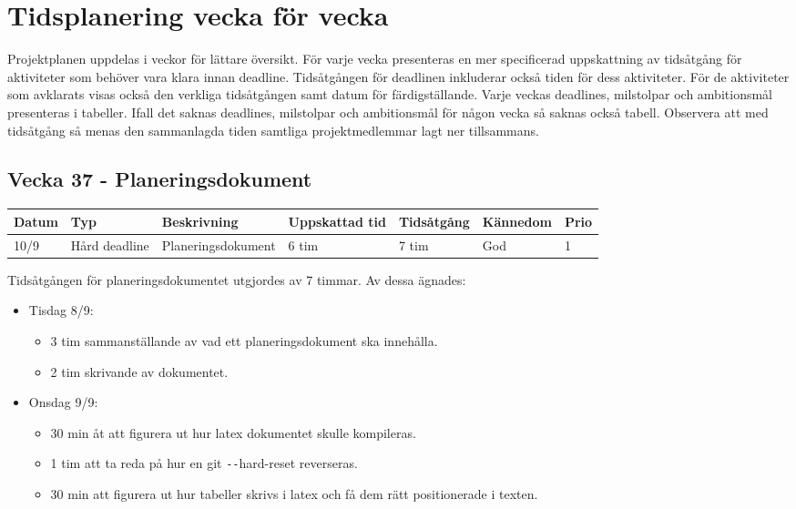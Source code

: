 \documentclass{TDP003mall}
\begin{document}
\section{Tidsplanering vecka för vecka}
Projektplanen uppdelas i veckor för lättare översikt. För varje vecka presenteras
 en mer specificerad uppskattning av tidsåtgång för aktiviteter som behöver vara
 klara innan deadline. Tidsåtgången för deadlinen inkluderar också tiden för dess
 aktiviteter. För de aktiviteter som avklarats visas också den verkliga tidsåtgången
 samt datum för färdigställande. Varje veckas deadlines, milstolpar och ambitionsmål presenteras
 i tabeller. Ifall det saknas deadlines, milstolpar och ambitionsmål för någon vecka så saknas också tabell. Observera att med tidsåtgång så menas den sammanlagda tiden samtliga projektmedlemmar lagt ner tillsammans.

\subsection*{Vecka 37 - Planeringsdokument}
\begin{tabularx}{\linewidth}{|l|l|X|l|l|l|l|}
	\hline
	Datum & Typ           & Beskrivning        & Uppskattad tid & Tidsåtgång & Kännedom & Prio \\ [0.5ex]
	\hline                                             
	10/9  & Hård deadline & Planeringsdokument & 6 tim             & 7 tim         & God      & 1    \\
	\hline
\end{tabularx}

Tidsåtgången för planeringsdokumentet utgjordes av 7 timmar. Av dessa ägnades:
\begin{itemize}
	\item Tisdag 8/9:
	\begin{itemize}
		\item 3 tim sammanställande av vad ett planeringsdokument ska innehålla.
		\item 2 tim skrivande av dokumentet.
	\end{itemize}
	\item Onsdag 9/9:
	\begin{itemize}
		\item 30 min åt att figurera ut hur latex dokumentet skulle kompileras.
		\item 1 tim att ta reda på hur en git \texttt{-{}-}hard-reset reverseras.
		\item 30 min att figurera ut hur tabeller skrivs i latex och få dem rätt positionerade i texten.\\
	\end{itemize}

      \end{itemize}
\end{document}
